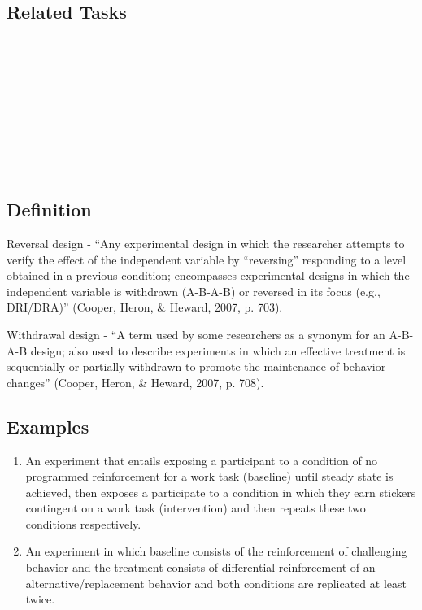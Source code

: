 \subsection{Related Tasks}
\fourbFour{}\\
\fourbFive{}\\
\fourbSix{}\\
\fourbSeven{}\\
\fourbNine{}\\
\fourbEleven{}\\ 
\fourhFour{}\\
\fouriOne{}\\
%
%
%
%
%
%            
\section{\fourbFour{}}
\subsection{Definition}
Reversal design - ``Any experimental design in which the researcher attempts to verify the effect of the independent variable by ``reversing'' responding to a level obtained in a previous condition; encompasses experimental designs in which the independent variable is withdrawn (A-B-A-B) or reversed in its focus (e.g., DRI/DRA)'' (Cooper, Heron, \& Heward, 2007, p. 703).

Withdrawal design - ``A term used by some researchers as a synonym for an A-B-A-B design; also used to describe experiments in which an effective treatment is sequentially or partially withdrawn to promote the maintenance of behavior changes'' (Cooper, Heron, \& Heward, 2007, p. 708).
%
\subsection{Examples}
\begin{enumerate}
\item An experiment that entails exposing a participant to a condition of no programmed reinforcement for a work task (baseline) until steady state is achieved, then exposes a participate to a condition in which they earn stickers contingent on a work task (intervention) and then repeats these two conditions respectively. 
\item An experiment in which baseline consists of the reinforcement of challenging behavior and the treatment consists of differential reinforcement of an alternative/replacement behavior and both conditions are replicated at least twice. 
\end{enumerate}
%
